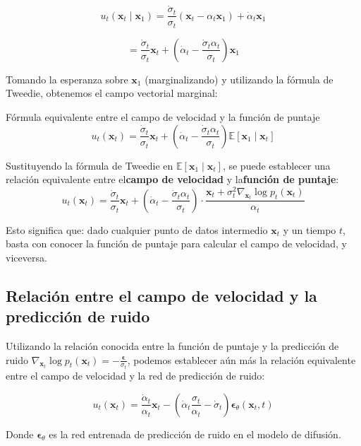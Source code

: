 $$u_t(\mathbf{x}_t \mid \mathbf{x}_1) = \frac{\dot{\sigma}_t}{\sigma_t}(\mathbf{x}_t - \alpha_t \mathbf{x}_1) + \dot{\alpha}_t \mathbf{x}_1$$

$$= \frac{\dot{\sigma}_t}{\sigma_t} \mathbf{x}_t + \left(\dot{\alpha}_t - \frac{\dot{\sigma}_t \alpha_t}{\sigma_t}\right) \mathbf{x}_1$$

Tomando la esperanza sobre $\mathbf{x}_1$ (marginalizando) y utilizando la fórmula de Tweedie, obtenemos el campo vectorial marginal:

\begin{importantbox}{Fórmula equivalente entre el campo de velocidad y la función de puntaje}
$$u_t(\mathbf{x}_t) = \frac{\dot{\sigma}_t}{\sigma_t} \mathbf{x}_t + \left(\dot{\alpha}_t - \frac{\dot{\sigma}_t \alpha_t}{\sigma_t}\right) \mathbb{E}[\mathbf{x}_1 \mid \mathbf{x}_t]$$

Sustituyendo la fórmula de Tweedie en $\mathbb{E}[\mathbf{x}_1 \mid \mathbf{x}_t]$, se puede establecer una relación equivalente entre el\textbf{campo de velocidad} y la\textbf{función de puntaje}:
$$u_t(\mathbf{x}_t) = \frac{\dot{\sigma}_t}{\sigma_t} \mathbf{x}_t + \left(\dot{\alpha}_t - \frac{\dot{\sigma}_t \alpha_t}{\sigma_t}\right) \cdot \frac{\mathbf{x}_t + \sigma_t^2 \nabla_{\mathbf{x}_t} \log p_t(\mathbf{x}_t)}{\alpha_t}$$

Esto significa que: dado cualquier punto de datos intermedio $\mathbf{x}_t$ y un tiempo $t$, basta con conocer la función de puntaje para calcular el campo de velocidad, y viceversa.
\end{importantbox}

\subsection{Relación entre el campo de velocidad y la predicción de ruido}

Utilizando la relación conocida entre la función de puntaje y la predicción de ruido $\nabla_{\mathbf{x}_t} \log p_t(\mathbf{x}_t) = -\frac{\boldsymbol{\epsilon}}{\sigma_t}$, podemos establecer aún más la relación equivalente entre el campo de velocidad y la red de predicción de ruido:

$$u_t(\mathbf{x}_t) = \frac{\dot{\alpha}_t}{\alpha_t} \mathbf{x}_t - \left(\dot{\alpha}_t \frac{\sigma_t}{\alpha_t} - \dot{\sigma}_t\right) \boldsymbol{\epsilon}_\theta(\mathbf{x}_t, t)$$

Donde $\boldsymbol{\epsilon}_\theta$ es la red entrenada de predicción de ruido en el modelo de difusión.


